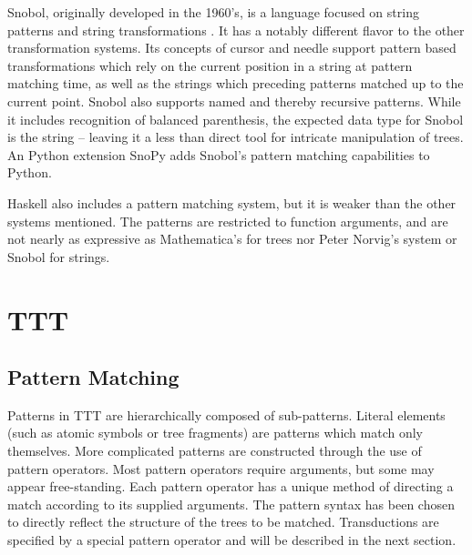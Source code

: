 \documentclass[11pt]{article}
\begin{document}
Snobol, originally developed in the 1960's, is a language focused on string patterns and string transformations \cite{Griswold:1971}.  It has a notably different flavor to the other transformation systems. Its concepts of cursor and needle support pattern based transformations which rely on the current position in a string at pattern matching time, as well as the strings which preceding patterns matched up to the current point.  Snobol also supports named and thereby recursive patterns.  While it includes recognition of balanced parenthesis, the expected data type for Snobol is the string -- leaving it a less than direct tool for intricate manipulation of trees.  An Python extension SnoPy adds Snobol's pattern matching capabilities to Python.  \cite{Rozenberg:2002}

Haskell also includes a pattern matching system, but it is weaker than the other systems mentioned.  The patterns are restricted to function arguments, and are not nearly as expressive as Mathematica's for trees nor Peter Norvig's system or Snobol for strings. \cite{Hudak:2000}


\section{TTT}
\subsection*{Pattern Matching}
Patterns in TTT are hierarchically composed of sub-patterns.  Literal elements (such as atomic symbols or tree fragments) are patterns which match only themselves.  More complicated patterns are constructed through the use of pattern operators.   Most pattern operators require arguments, but some may appear free-standing.  Each pattern operator has a unique method of directing a match according to its supplied arguments.  The pattern syntax has been chosen to directly reflect the structure of the trees to be matched. Transductions are specified by a special pattern operator and will be described in the next section.
\end{document}
